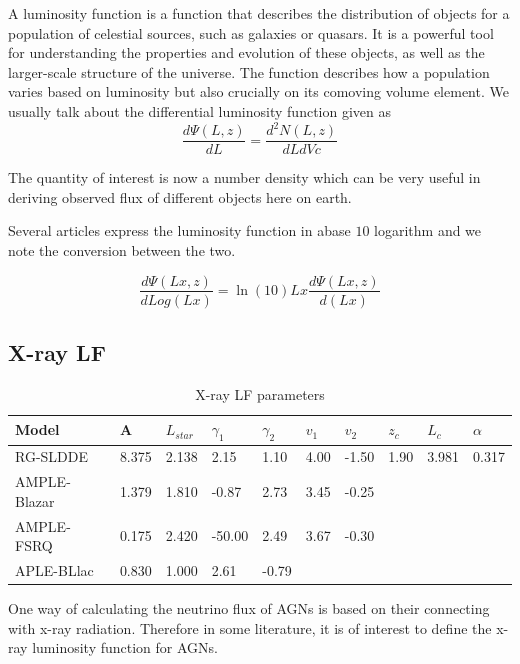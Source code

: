 \documentclass{article}
\begin{document}
A luminosity function is a function that describes the distribution of objects for a population of celestial sources,
such as galaxies or quasars. It is a powerful tool for understanding the properties and evolution of 
these objects, as well as the larger-scale structure of the universe. 
The function describes how a population varies based on luminosity but also crucially on its comoving volume element. 
 We usually talk about the differential luminosity function given as
\begin{equation}
    \frac{d\Psi(L,z)}{dL} = \frac{d^2N(L,z)}{dLdVc}
\end{equation}

The quantity of interest is now a number density which can be very useful in deriving observed flux of different objects here on earth. 

Several articles express the luminosity function in abase $10$ logarithm and we note the conversion between the two. 

\begin{equation}
    \frac{d\Psi(Lx,z)}{dLog(Lx)} =  \ln (10)  Lx \frac{d\Psi(Lx,z)}{d(Lx)}
\end{equation}

\subsection{X-ray LF}

\begin{table}
\centering
\begin{tabularx}{\textwidth}{|l|X|X|X|X|X|X|X|X|X|}
\hline
Model & A & $L_{star}$ & $\gamma _1$ &  $\gamma _2$  & $v_1$ & $v_2$ & $z_c$ & $L_c$ & $ \alpha$\\
\hline
RG-SLDDE & 8.375 & 2.138 & 2.15 & 1.10 & 4.00 & -1.50 & 1.90 & 3.981 & 0.317  \\
\hline
AMPLE-Blazar & 1.379 & 1.810 & -0.87 & 2.73 & 3.45 & -0.25 & & &  \\
\hline
AMPLE-FSRQ & 0.175 & 2.420& -50.00 & 2.49 & 3.67 & -0.30 & & &  \\
\hline
APLE-BLlac & 0.830& 1.000 & 2.61 & -0.79 & & & & &  \\
\hline
\end{tabularx}
\caption{X-ray LF parameters}
\end{table}


One way of calculating the neutrino flux of AGNs is based on their connecting with x-ray radiation. Therefore in some literature, it is of interest to define the x-ray luminosity function for AGNs.
\end{document}
